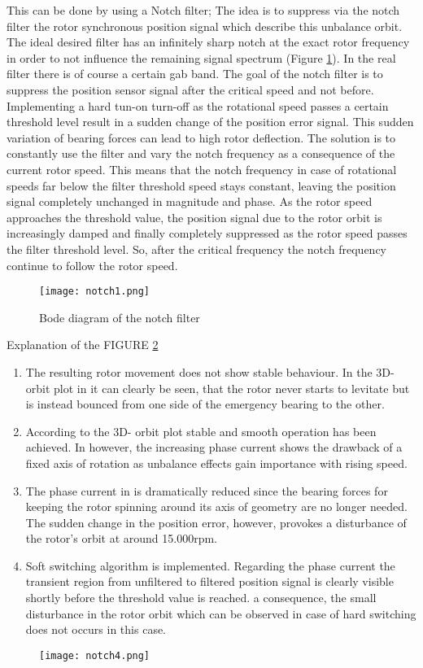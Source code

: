 This can be done by using a Notch filter; The idea is to suppress via the notch filter the rotor synchronous position signal which describe this unbalance orbit. The ideal desired filter has an infinitely sharp notch at the exact rotor frequency in order to not influence the remaining signal spectrum (Figure \ref{notch1}). In the real filter there is of course a certain gab band. 
The goal of the notch filter is to suppress the position sensor signal after the critical speed and not before. Implementing a hard tun-on turn-off as the rotational speed passes a certain threshold level result in a sudden change of the position error signal. This sudden variation of bearing forces can lead to high rotor deflection. The solution is to constantly use the filter and vary the notch frequency as a consequence of the current rotor speed.
This means that the notch frequency in case of rotational speeds far below the filter threshold speed stays constant, leaving the position signal completely unchanged in magnitude and phase. As the rotor speed approaches the threshold value, the position signal due to the rotor orbit is increasingly damped and finally completely suppressed as the rotor speed passes the filter threshold level.
So, after the critical frequency the notch frequency continue to follow the rotor speed.

\begin{figure}[H]
    \centering
    \texttt{[image: notch1.png]}
    \caption{Bode diagram of the notch filter}
    \label{notch1}
\end{figure}


Explanation of the FIGURE \ref{notch4}
\begin{enumerate}[label=\Alph*)]
\item The resulting rotor movement does not show stable behaviour. In the 3D- orbit plot in it can clearly be seen, that the rotor never starts to levitate but is instead bounced from one side of the emergency bearing to the other. 
\item According to the 3D- orbit plot stable and smooth operation has been achieved. In however, the increasing phase current shows the drawback of a fixed axis of rotation as unbalance effects gain importance with rising speed.
\item The phase current in is dramatically reduced since the bearing forces for keeping the rotor spinning around its axis of geometry are no longer needed. The sudden change in the position error, however, provokes a disturbance of the rotor's orbit at around 15.000rpm.
\item Soft switching algorithm is implemented. Regarding the phase current the transient region from unfiltered to filtered position signal is clearly visible shortly before the threshold value is reached. a consequence, the small disturbance in the rotor orbit which can be observed in case of hard switching does not occurs in this case.
\end{enumerate}

\begin{figure}[H]
    \centering
    \texttt{[image: notch4.png]}
    \caption{}
    \label{notch4}
\end{figure}
